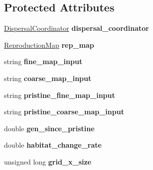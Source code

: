 \subsection*{Protected Attributes}
\begin{DoxyCompactItemize}
\item 
\hyperlink{class_dispersal_coordinator}{Dispersal\+Coordinator} {\bfseries dispersal\+\_\+coordinator}\hypertarget{class_spatial_tree_ad238e987bbf1cf2110bd6c3b980de3e4}{}\label{class_spatial_tree_ad238e987bbf1cf2110bd6c3b980de3e4}

\item 
\hyperlink{class_reproduction_map}{Reproduction\+Map} {\bfseries rep\+\_\+map}\hypertarget{class_spatial_tree_aee26e469bc42c208feb98f6320bd9d0c}{}\label{class_spatial_tree_aee26e469bc42c208feb98f6320bd9d0c}

\item 
string {\bfseries fine\+\_\+map\+\_\+input}\hypertarget{class_spatial_tree_a44fdea35be7d4496248ee27c1457ad6a}{}\label{class_spatial_tree_a44fdea35be7d4496248ee27c1457ad6a}

\item 
string {\bfseries coarse\+\_\+map\+\_\+input}\hypertarget{class_spatial_tree_a464b674dbf6f2968497f698ad9a16433}{}\label{class_spatial_tree_a464b674dbf6f2968497f698ad9a16433}

\item 
string {\bfseries pristine\+\_\+fine\+\_\+map\+\_\+input}\hypertarget{class_spatial_tree_a0b6a624a8d0a434131f3ec5e2581d8b6}{}\label{class_spatial_tree_a0b6a624a8d0a434131f3ec5e2581d8b6}

\item 
string {\bfseries pristine\+\_\+coarse\+\_\+map\+\_\+input}\hypertarget{class_spatial_tree_abf4a4019079d23e4489420fc14f0e461}{}\label{class_spatial_tree_abf4a4019079d23e4489420fc14f0e461}

\item 
double {\bfseries gen\+\_\+since\+\_\+pristine}\hypertarget{class_spatial_tree_a0ddea193979944b5df0e317cf1fe5be3}{}\label{class_spatial_tree_a0ddea193979944b5df0e317cf1fe5be3}

\item 
double {\bfseries habitat\+\_\+change\+\_\+rate}\hypertarget{class_spatial_tree_abdb9b4692e583b7db0e292cd0e26da56}{}\label{class_spatial_tree_abdb9b4692e583b7db0e292cd0e26da56}

\item 
unsigned long {\bfseries grid\+\_\+x\+\_\+size}\hypertarget{class_spatial_tree_aa4c60d73794de44877b9ed66b73b4ed8}{}\label{class_spatial_tree_aa4c60d73794de44877b9ed66b73b4ed8}


\end{DoxyCompactItemize}
